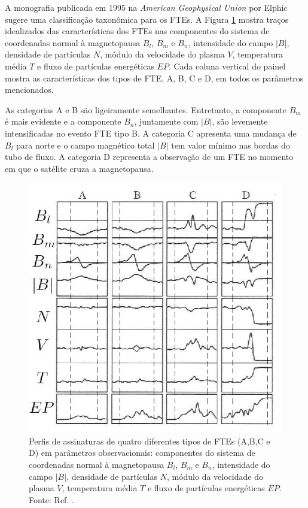 A monografia publicada em 1995 na \textit{American Geophysical Union} por Elphic \cite{Elphic1995} sugere uma classificação taxonômica para os FTEs. A Figura \ref{tipofte} mostra traços idealizados das características dos FTEs nas componentes do sistema de coordenadas normal à magnetopausa $B_{l}$, $B_{m}$ e $B_{n}$, intensidade do campo $|B|$, densidade de partículas $N$, módulo da velocidade do plasma $V$, temperatura média $T$ e fluxo de partículas energéticas $EP$. Cada coluna vertical do painel mostra as características dos tipos de FTE, A, B, C e D, em todos os parâmetros mencionados. 

As categorias A e B são ligeiramente semelhantes. Entretanto, a componente $B_m$ é mais evidente e a componente $B_n$, juntamente com $|B|$, são levemente intensificadas no evento FTE tipo B. A categoria C apresenta uma mudança de $B_{l}$ para norte e o campo magnético total $|B|$ tem valor mínimo nas bordas do tubo de fluxo. A categoria D representa a observação de um FTE no momento em que o satélite cruza a magnetopausa.

\begin{figure} [ht]
	\begin{center}
		\includegraphics[scale=0.45]{tipofte.jpg}
		\caption{Perfis de assinaturas de quatro diferentes tipos de FTEs (A,B,C e D) em parâmetros observacionais: componentes do sistema de coordenadas normal à magnetopausa $B_{l}$, $B_{m}$ e $B_{n}$, intensidade do campo $|B|$, densidade de partículas $N$, módulo da velocidade do plasma $V$, temperatura média $T$ e fluxo de partículas energéticas $EP$. Fonte: Ref. \cite{Elphic1995}.}
		\label{tipofte}
	\end{center}
\end{figure}

